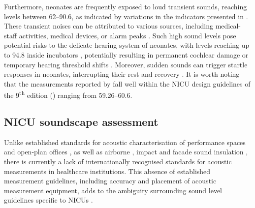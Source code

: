  Furthermore, neonates are frequently exposed to loud transient sounds, reaching levels between \num{62}--\SI{90.6}{\decibelA}, as indicated by variations in the  indicators presented in . These transient noises can be attributed to various sources, including medical-staff activities, medical devices, or alarm peaks \citep{Bertsch2020}. Such high sound levels pose potential risks to the delicate hearing system of neonates, with  levels reaching up to \SI{94.8}{\decibelA} inside incubators \citep{Parra2017}, potentially resulting in permanent cochlear damage \citep{Surenthiran2003} or temporary hearing threshold shifts \citep{McCullagh1979}. Moreover, sudden sounds can trigger startle responses in neonates, interrupting their rest and recovery \citep{Philbin1999}. It is worth noting that the  measurements reported by \citeauthor{Krueger2007} fall well within the NICU design guidelines of the 9\textsuperscript{th} edition () ranging from 59.26--\SI{60.6}{\decibelA}. 




\subsection{NICU soundscape assessment}

\iftodo
\begin{itemize}[leftmargin=*]
\end{itemize}
\fi

Unlike established standards for acoustic characterisation of performance spaces \citep{ISO3382-1} and open-plan offices \citep{ISO3382-3}, as well as airborne \citep{ISO16283-1}, impact \citep{ISO16283-2} and facade sound insulation \citep{iso12913-3}, there is currently a lack of internationally recognised standards for acoustic measurements in healthcare institutions. This absence of established measurement guidelines, including accuracy and placement of acoustic measurement equipment, adds to the ambiguity surrounding sound level guidelines specific to NICUs \citep{Philbin2017}. 

